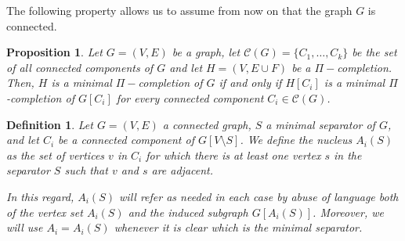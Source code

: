 \documentclass[12pt]{book}
\theoremstyle{plain}
\newtheorem{prop}[teo]{Proposition}
\newtheorem{defn}[teo]{Definition}
\theoremstyle{remark}
\begin{document}
The following property allows us to assume from now on that the graph $G$ is connected.

\begin{prop} \cite{LMP10} \label{PIC_p1}
	Let $G = (V, E)$ be a graph, let $\mathcal{C} (G)= \{C_1, \ldots, C_k \}$ be the set of all connected components of $G$ and let $H = (V, E \cup F)$ be a $\Pi-$completion. 
	Then, $H$ is a minimal $\Pi-$completion of $G$ if and only if $H \left[ C_i \right]$
	is a minimal $\Pi$-completion of $G \left[ C_i \right]$ for every connected component $C_i \in \mathcal{C} (G)$.
\end{prop}

\begin{comment}
\begin{proof}
$ \Rightarrow ) $  Suppose there is a connected component $C_i \in \mathcal{C} (G)$ such that $H \left[ C_i \right]$ is not a minimal $\Pi$-completion of $G \left[ C_i \right]$. 
Thus, we can find a $\Pi$-completion $H^{'}$ of $G \left[ C_i \right]$ such that 
$G \left[ C_i \right] \subseteq H^{'} \subsetneq H \left[ C_i \right]$. Therefore, $H$ is not minimal and this results in a contradiction.

$ \Leftarrow ) $  If $H \left[ C_i \right]$ is a minimal $\Pi-$completion of $G \left[ C_i \right]$ for every $C_i \in \mathcal{C} (G)$, then it is not possible to remove
any edges from each connected component. Since there are no edges between distinct components, we cannot remove any subset of edges and hence $H$ is minimal.
\end{proof}

We may assume from now on that the graph $G$ is connected.

\end{comment}


\vspace{0.5mm}
\begin{defn} \label{PIC_def1}
	Let $G = (V, E)$ a connected graph, $S$ a minimal separator of $G$, and let $C_i$ be a connected component of $G \left[ V \setminus S \right]$.
	We define the \emph{nucleus $A_i(S)$} as the set of vertices $v$ in $C_i$ for which there is at least one vertex $s$ in the separator $S$ such that $v$ and $s$ are adjacent.
		
	In this regard, $A_i(S)$ will refer as needed in each case by abuse of language both of the vertex set $A_i(S)$ and the induced subgraph $G \left[ A_i(S) \right]$.
	Moreover, we will use $A_i = A_i(S)$ whenever it is clear which is the minimal separator. 
\end{defn}
\end{document}
